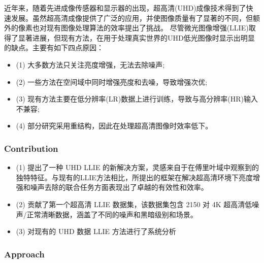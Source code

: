 \documentclass[letterpaper,10pt]{article}
\begin{document}
	近年来，随着先进成像传感器和显示器的出现，超高清(UHD)成像技术得到了快速发展。虽然超高清成像提供了广泛的应用，并使图像质量有了显著的不同，但额外的像素也对现有图像处理算法的效率提出了挑战。
	尽管微光图像增强(LLIE)取得了显著进展，但现有方法，在用于处理真实世界的UHD低光图像时显示出明显的缺点。主要有如下四点原因：
	
	\begin{itemize}
		\item {}
			(1) 大多数方法只关注亮度增强，无法去除噪声;
		\item {}
			(2) 一些方法在空间域中同时增强亮度和去噪，导致增强次优;
		\item {}
			(3) 现有方法主要在低分辨率(LR)数据上进行训练，导致与高分辨率(HR)输入不兼容;
		\item {}
			(4) 部分研究采用重结构，因此在处理超高清图像时效率低下。
	\end{itemize}
		
	\subsubsection{Contribution}

	\begin{itemize}
		\item {}
			(1) 提出了一种 UHD LLIE 的新解决方案，灵感来自于在傅里叶域中观察到的独特特征。与现有的LLIE方法相比，所提出的框架在解决超高清环境下亮度增强和噪声去除的联合任务方面表现出了卓越的有效性和效率。
		\item {}
			(2) 贡献了第一个超高清 LLIE 数据集，该数据集包含 2150 对 4K 超高清低噪声/正常清晰数据，涵盖了不同的噪声和黑暗级别和场景。
		\item {}
			(3) 对现有的 UHD 数据 LLIE 方法进行了系统分析
	\end{itemize}
	
	\subsubsection{Approach}
	
\end{document}
